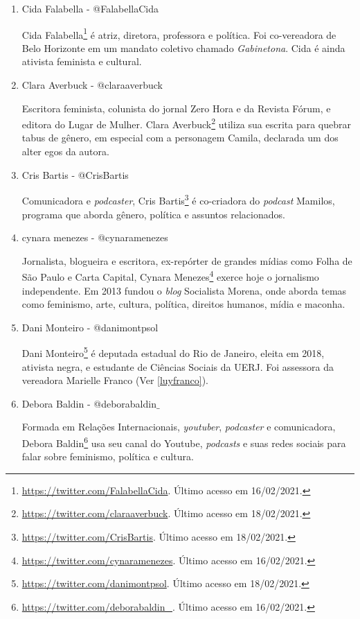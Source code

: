 \documentclass[
	12pt,				%
	openright,			%
	twoside,			%
	a4paper,			%
	english,			%
	brazil				%
	]{abntex2}
\begin{document}
\begin{anexosenv}
\begin{enumerate}
 \item Cida Falabella - @FalabellaCida
 
 Cida Falabella\footnote{\url{https://twitter.com/FalabellaCida}. Último acesso em 16/02/2021.} é atriz, diretora, professora e política. Foi co-vereadora de Belo Horizonte em um mandato coletivo chamado \textit{Gabinetona}. Cida é ainda ativista feminista e cultural.

 \item Clara Averbuck - @claraaverbuck
 
 Escritora feminista, colunista do jornal Zero Hora e da Revista Fórum, e editora do Lugar de Mulher. Clara Averbuck\footnote{\url{https://twitter.com/claraaverbuck}. Último acesso em 18/02/2021.} utiliza sua escrita para quebrar tabus de gênero, em especial com a personagem Camila, declarada um dos alter egos da autora.

 \item Cris Bartis - @CrisBartis\label{crisbartis}
 
 Comunicadora e \textit{podcaster}, Cris Bartis\footnote{\url{https://twitter.com/CrisBartis}. Último acesso em 18/02/2021.} é co-criadora do \textit{podcast} Mamilos, programa que aborda gênero, política e assuntos relacionados.

 \item cynara menezes - @cynaramenezes
 
 Jornalista, blogueira e escritora, ex-repórter de grandes mídias como Folha de São Paulo e Carta Capital, Cynara Menezes\footnote{\url{https://twitter.com/cynaramenezes}. Último acesso em 16/02/2021.} exerce hoje o jornalismo independente. Em 2013 fundou o \textit{blog} Socialista Morena, onde aborda temas como feminismo, arte, cultura, política, direitos humanos, mídia e maconha.

 \item Dani Monteiro - @danimontpsol\label{danimonteiro}
 
 Dani Monteiro\footnote{\url{https://twitter.com/danimontpsol}. Último acesso em 18/02/2021.} é deputada estadual do Rio de Janeiro, eleita em 2018, ativista negra, e estudante de Ciências Sociais da UERJ. Foi assessora da vereadora Marielle Franco (Ver \ref{luyfranco}).

 \item Debora Baldin - @deborabaldin$\_$
 
 Formada em Relações Internacionais, \textit{youtuber}, \textit{podcaster} e comunicadora, Debora Baldin\footnote{\url{https://twitter.com/deborabaldin_}. Último acesso em 16/02/2021.} usa seu canal do Youtube, \textit{podcasts} e suas redes sociais para falar sobre feminismo, política e cultura.


\end{enumerate}
\end{anexosenv}
\end{document}
